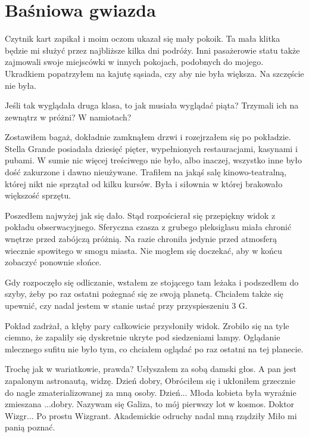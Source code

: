 \chapter{Baśniowa gwiazda} 


Czytnik kart zapikał i moim oczom ukazał się mały pokoik. 
Ta mała klitka będzie mi służyć przez najbliższe kilka dni podróży.
Inni pasażerowie statu także zajmowali swoje miejscówki w innych pokojach, podobnych do mojego.
Ukradkiem popatrzyłem na kajutę sąsiada, czy aby nie była większa. 
Na szczęście nie była.

Jeśli tak wyglądała druga klasa, to jak musiała wyglądać piąta? 
Trzymali ich na zewnątrz w próżni? W namiotach?

Zostawiłem bagaż, dokładnie zamknąłem drzwi i rozejrzałem się po pokładzie.
Stella Grande posiadała dziesięć pięter, wypełnionych restauracjami, kasynami i pubami.
W sumie nic więcej treściwego nie było, albo inaczej, wszystko inne było dość zakurzone i dawno nieużywane.
Trafiłem na jakąś salę kinowo-teatralną, której nikt nie sprzątał od kilku kursów.
Była i siłownia w której brakowało większość sprzętu.

Poszedłem najwyżej jak się dało.
Stąd rozpościerał się przepiękny widok z pokładu obserwacyjnego.
Sferyczna czasza z grubego pleksiglasu miała chronić wnętrze przed zabójczą próżnią.
Na razie chroniła jedynie przed atmosferą wiecznie spowitego w smogu miasta.
Nie mogłem się doczekać, aby w końcu zobaczyć ponownie słońce.

Gdy rozpoczęło się odliczanie, wstałem ze stojącego tam leżaka i podszedłem do szyby, żeby po raz ostatni pożegnać się ze swoją planetą.
Chciałem także się upewnić, czy nadal jestem w stanie ustać przy przyspieszeniu 3 G.

Pokład zadrżał, a kłęby pary całkowicie przysłoniły widok.
Zrobiło się na tyle ciemno, że zapaliły się dyskretnie ukryte pod siedzeniami lampy.
Oglądanie mlecznego sufitu nie było tym, co chciałem oglądać po raz ostatni na tej planecie.

\begin{dialogue}
	\ds{} Trochę jak w wariatkowie, prawda? \dm{} Usłyszałem za sobą damski głos. \dm{} A pan jest zapalonym astronautą, widzę.
	\ds{} Dzień dobry,  \dm{} Obróciłem się i ukłoniłem grzecznie do nagle zmaterializowanej za mną osoby.
	\ds{} Dzień... \dm{} Młoda kobieta była wyraźnie zmieszana \dm{} ...dobry. Nazywam się Galiza, to mój pierwszy lot w kosmos.
	\ds{} Doktor Wizgr... Po prostu Wizgrant. \dm{} Akademickie odruchy nadal mną rządziły \dm{} Miło mi panią poznać.
\end{dialogue}

